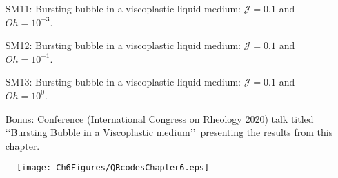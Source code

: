 \begin{subappendices}
\begin{enumerate}
	\item[SM11:] Bursting bubble in a viscoplastic liquid medium: $\mathcal{J} = 0.1$ and $Oh = 10^{-3}$. 
	\item[SM12:] Bursting bubble in a viscoplastic liquid medium: $\mathcal{J} = 0.1$ and $Oh = 10^{-1}$. 
	\item[SM13:] Bursting bubble in a viscoplastic liquid medium: $\mathcal{J} = 0.1$ and $Oh = 10^{0}$. 
	\item[Bonus:] Conference (International Congress on Rheology 2020) talk titled \lq\lq Bursting Bubble in a Viscoplastic medium\rq\rq\, presenting the results from this chapter. 
\end{enumerate}

\begin{figure*}
	\centering
	\texttt{[image: Ch6Figures/QRcodesChapter6.eps]}
\end{figure*}

\end{subappendices}